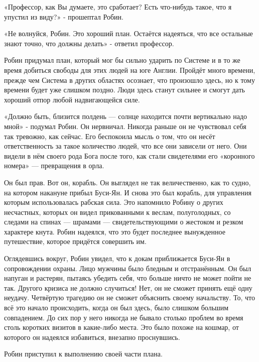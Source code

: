 \documentclass[a4paper,12pt]{book}
\begin{document}
\par
«Профессор, как Вы думаете, это сработает? Есть что-нибудь такое, что я упустил из виду?» - прошептал Робин.
\par
«Не волнуйся, Робин. Это хороший план. Остаётся надеяться, что все остальные знают точно, что должны делать» - ответил профессор.\\
\par
Робин придумал план, который мог бы сильно ударить по Системе и в то же время добиться свободы для этих людей на юге Англии. Пройдёт много времени, прежде чем Система в других областях осознает, что произошло здесь, но к тому времени будет уже слишком поздно. Люди здесь станут сильнее и смогут дать хороший отпор любой надвигающейся силе.
\par
«Должно быть, близится полдень — солнце находится почти вертикально надо мной» - подумал Робин. Он нервничал. Никогда раньше он не чувствовал себя так тревожно, как сейчас. Его беспокоила мысль о том, что он несёт ответственность за такое количество людей, что все они зависели от него. Они видели в нём своего рода Бога после того, как стали свидетелями его «коронного номера» — превращения в орла.\\
\par
Он был прав. Вот он, корабль. Он выглядел не так величественно, как то судно, на котором накануне прибыл Буси-Ян. И снова это был корабль, для управления которым использовалась рабская сила. Это напомнило Робину о других несчастных, которых он видел прикованными к веслам, полуголодных, со следами на спинах — шрамами — свидетельствующими о жестоком и резком характере кнута. Робин надеялся, что это будет последнее вынужденное путешествие, которое придётся совершить им.
\par
Оглядевшись вокруг, Робин увидел, что к докам приближается Буси-Ян в сопровождении охраны. Лицо мужчины было бледным и отстранённым. Он был напуган и растерян, пытаясь убедить себя, что больше ничто не может пойти не так. Другого кризиса не должно случиться! Нет, он не сможет принять ещё одну неудачу. Четвёртую трагедию он не сможет объяснить своему начальству. То, что всё это начало происходить, когда он был здесь, было слишком большим совпадением. До сих пор у него никогда не бывало столько проблем во время столь коротких визитов в какие-либо места. Это было похоже на кошмар, от которого он надеялся избавиться, внезапно проснувшись.\\
\par
Робин приступил к выполнению своей части плана.
\par
\end{document}
